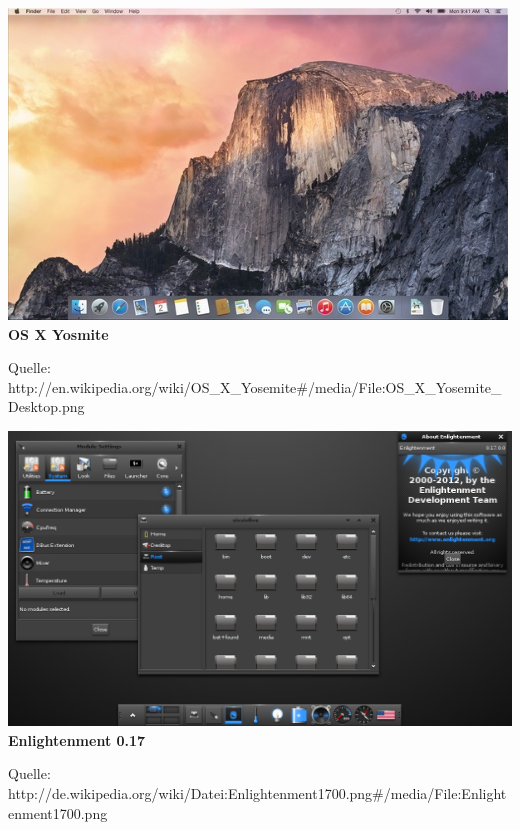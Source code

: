 \documentclass[12pt,a4paper]{report}
\begin{document}
\begin{onehalfspace}
\begin{center}
\includegraphics[scale=1]{../docs/lyaton/graphics/Apple_OS_X_Yosemite.png}\\
\textbf{OS X Yosmite}\\
\begin{scriptsize}
Quelle: http://en.wikipedia.org/wiki/OS\_X\_Yosemite\#/media/File:OS\_X\_Yosemite\_Desktop.png
\end{scriptsize}
\end{center}

\begin{center}
\includegraphics[scale=0.4]{../docs/lyaton/graphics/Enlightenment1700.png}\\
\textbf{Enlightenment 0.17}\\
\begin{scriptsize}
Quelle: http://de.wikipedia.org/wiki/Datei:Enlightenment1700.png\#/media/File:Enlightenment1700.png
\end{scriptsize}
\end{center}


\end{onehalfspace}
\end{document}
